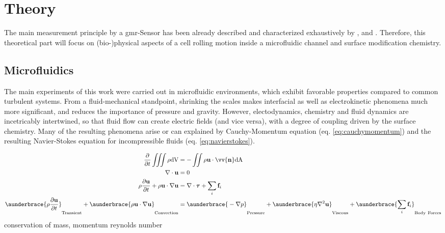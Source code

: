 \chapter{Theory}
The main measurement principle by a \gls{gmr}-Sensor has been already described and characterized exhaustively by \citet{lit:thes:helou}, \citet{lit:thes:reisbeck} and \citet{lit:thes:brenner}. Therefore, this theoretical part will focus on (bio-)physical aspects of a cell rolling motion inside a microfluidic channel and surface modification chemistry.

\section{Microfluidics}
The main experiments of this work were carried out in microfluidic environments, which exhibit favorable properties compared to common turbulent systems. From a fluid-mechanical standpoint, shrinking the scales makes interfacial as well as electrokinetic phenomena much more significant, and reduces the importance of pressure and gravity.\cite{lit:fluidic:kirby} However, electodynamics, chemistry and fluid dynamics are incetricably intertwined, so that fluid flow can create electric fields (and vice versa), with a degree of coupling driven by the surface chemistry. Many of the resulting phenomena arise or can explained by Cauchy-Momentum equation (eq. \ref{eq:cauchymomentum}) and the resulting Navier-Stokes equation for incompressible fluids (eq. \ref{eq:navierstokes}).

\begin{align}
	\frac{\partial}{\partial t} \iiint \rho \mathrm{dV} &= - \iint \rho \mathbf{u} \cdot \vv{\mathbf{n}} \mathrm{dA} \\
	\nabla \cdot \mathbf{u} &= 0 \\
		\rho \frac{\partial \mathbf{u}}{\partial t} + \rho\mathbf{u} \cdot \nabla \mathbf{u} &= \nabla \cdot \boldsymbol{\tau} + \sum_{i}\mathbf{f}_i \label{eq:cauchymomentum} \\	
	\aunderbrace{\vphantom{\sum_{i}} \rho \frac{\partial \mathbf{u}}{\partial t}}_{\mathrm{Transient}} + \aunderbrace{\vphantom{\sum_{i}}\rho\mathbf{u} \cdot \nabla \mathbf{u}}_{\mathrm{Convection}} &= \aunderbrace{\vphantom{\sum_{i}}-\nabla p}_{\mathrm{Pressure}} + \aunderbrace{\vphantom{\sum_{i}}\eta \nabla^2 \mathbf{u}}_{\mathrm{Viscous}} + \aunderbrace{\sum_{i}\mathbf{f}_i}_{\mathrm{Body \ Forces}} \label{eq:navierstokes}
\end{align}
conservation of mass, momentum
reynolds number
